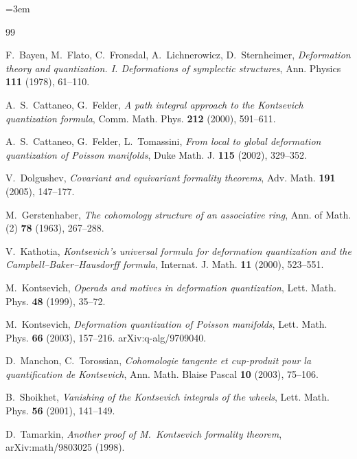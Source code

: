 \documentclass[11pt,a4paper]{article}
\theoremstyle{definition}
\begin{document}
\begingroup
\emergencystretch=3em
\begin{thebibliography}{99}

F.~Bayen, M.~Flato, C.~Fronsdal, A.~Lichnerowicz, D.~Sternheimer,
\emph{Deformation theory and quantization. I. Deformations of
symplectic structures}, Ann. Physics \textbf{111} (1978), 61--110.

A.~S.~Cattaneo, G.~Felder,
\emph{A path integral approach to the Kontsevich quantization formula},
Comm. Math. Phys. \textbf{212} (2000), 591--611.

A.~S.~Cattaneo, G.~Felder, L.~Tomassini,
\emph{From local to global deformation quantization of Poisson
manifolds}, Duke Math. J. \textbf{115} (2002), 329--352.

V.~Dolgushev,
\emph{Covariant and equivariant formality theorems},
Adv. Math. \textbf{191} (2005), 147--177.

M.~Gerstenhaber,
\emph{The cohomology structure of an associative ring},
Ann. of Math. (2) \textbf{78} (1963), 267--288.

V.~Kathotia,
\emph{Kontsevich's universal formula for deformation quantization and
the Campbell--Baker--Hausdorff formula},
Internat. J. Math. \textbf{11} (2000), 523--551.

M.~Kontsevich,
\emph{Operads and motives in deformation quantization},
Lett. Math. Phys. \textbf{48} (1999), 35--72.

M.~Kontsevich,
\emph{Deformation quantization of Poisson manifolds},
Lett. Math. Phys. \textbf{66} (2003), 157--216.
arXiv:q-alg/9709040.

D.~Manchon, C.~Torossian,
\emph{Cohomologie tangente et cup-produit pour la quantification de
Kontsevich}, Ann. Math. Blaise Pascal \textbf{10} (2003), 75--106.

B.~Shoikhet,
\emph{Vanishing of the Kontsevich integrals of the wheels},
Lett. Math. Phys. \textbf{56} (2001), 141--149.

D.~Tamarkin,
\emph{Another proof of M.~Kontsevich formality theorem},
arXiv:math/9803025 (1998).

\end{thebibliography}
\endgroup
\end{document}
